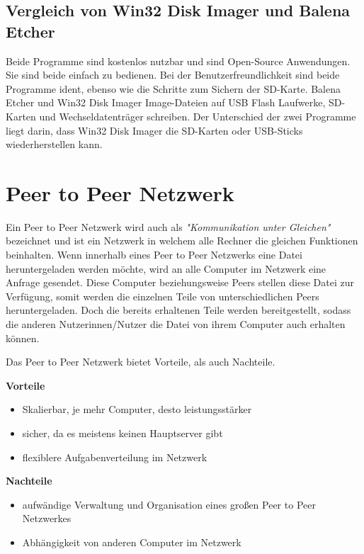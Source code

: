 \subsection{Vergleich von Win32 Disk Imager und Balena Etcher}
Beide Programme sind kostenlos nutzbar und sind Open-Source Anwendungen. Sie sind beide einfach zu bedienen. Bei der Benutzerfreundlichkeit sind beide Programme ident, ebenso wie die Schritte zum Sichern der SD-Karte. Balena Etcher und Win32 Disk Imager  Image-Dateien auf USB Flash Laufwerke, SD-Karten und Wechseldatenträger schreiben. Der Unterschied der zwei Programme liegt darin, dass Win32 Disk Imager die SD-Karten oder USB-Sticks wiederherstellen kann. \parencite{VergleichvonWin32DiskImagerundBalenaEtcher}

\section{Peer to Peer Netzwerk}
Ein Peer to Peer Netzwerk wird auch als \textit{"Kommunikation unter Gleichen"} bezeichnet und ist ein Netzwerk in welchem alle Rechner die gleichen Funktionen beinhalten. Wenn innerhalb eines Peer to Peer Netzwerks eine Datei heruntergeladen werden möchte, wird an alle Computer im Netzwerk eine Anfrage gesendet. Diese Computer beziehungsweise Peers stellen diese Datei zur Verfügung, somit werden die einzelnen Teile von unterschiedlichen Peers heruntergeladen. Doch die bereits erhaltenen Teile werden bereitgestellt, sodass die anderen Nutzerinnen/Nutzer die Datei von ihrem Computer auch erhalten können. \parencite{PeertoPeerNetzwerk}

Das Peer to Peer Netzwerk bietet Vorteile, als auch Nachteile. 

\textbf{Vorteile}
\begin{itemize}
	\item Skalierbar, je mehr Computer, desto leistungsstärker
	\item sicher, da es meistens keinen Hauptserver gibt
	\item flexiblere Aufgabenverteilung im Netzwerk 
\end{itemize}

\textbf{Nachteile}
\begin{itemize}
	\item aufwändige Verwaltung und Organisation eines großen Peer to Peer Netzwerkes 
	\item Abhängigkeit von anderen Computer im Netzwerk
\end{itemize}

